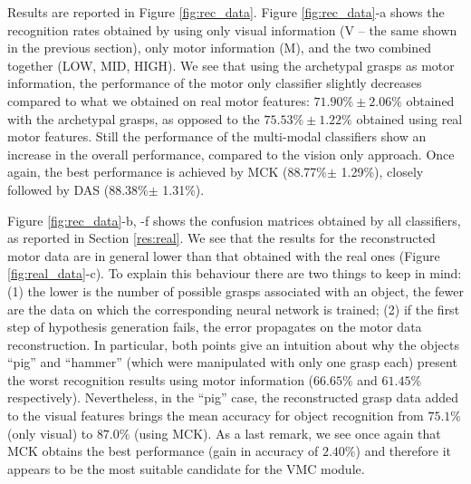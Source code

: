 Results are reported in Figure \ref{fig:rec_data}. Figure \ref{fig:rec_data}-a shows the recognition rates obtained by using 
only visual information (V -- the same shown in the previous section), only motor information (M), and the two combined together 
(LOW, MID, HIGH). 
We see that using the archetypal grasps as motor information, the performance of the motor only classifier slightly decreases compared to
what we obtained on real motor features: $71.90\%\pm2.06\%$  obtained with the archetypal grasps, as opposed to the
$75.53\%\pm1.22\%$ obtained using real motor features. Still the performance of the multi-modal classifiers show an increase in the overall performance,
compared to the vision only approach.
Once again, the best performance is achieved by MCK (88.77\%$\pm$ 1.29\%), closely followed by DAS (88.38\%$\pm$ 1.31\%).


Figure \ref{fig:rec_data}-b, -f 
shows the confusion matrices obtained by 
all classifiers, as reported in Section \ref{res:real}.
We see that the results for the reconstructed motor data are in general lower than that obtained with the
real ones (Figure \ref{fig:real_data}-c). To explain this behaviour there are two things to keep in mind: (1) the lower is the number of
possible grasps associated with an object, the fewer are the data on which the corresponding neural
network is trained; (2) if the first step of hypothesis generation  fails, the error propagates
on the motor data reconstruction. In particular, both points give an intuition about why the objects ``pig'' and ``hammer'' (which were manipulated with only one grasp each) present the worst recognition results using motor
information ($66.65\%$ and $61.45\%$ respectively). Nevertheless, in the ``pig'' case, 
the reconstructed grasp data added to the visual features brings the mean accuracy for object recognition from 
$75.1\%$ (only visual) to $87.0\%$ (using MCK).
As a last remark, we see once again that MCK obtains the best performance (gain in accuracy of $2.40\%$) and therefore it appears to be the most
suitable candidate for the VMC module.





